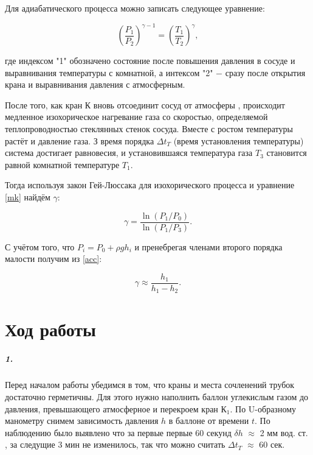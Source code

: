 \documentclass[a4paper,12pt]{article}
\begin{document}
Для адиабатического процесса можно записать следующее уравнение: 

\begin{equation}\label{mk}
\left(\dfrac{P_1}{P_2}\right)^{\gamma - 1} = \left(\dfrac{T_1}{T_2}\right)^\gamma , 
\end{equation} 

где индексом "1" обозначено состояние после повышения давления в сосуде и выравнивания температуры с комнатной, а интексом "2"  $-$ сразу после открытия крана и выравнивания давления с атмосферным. 

После того, как кран К вновь отсоединит сосуд от атмосферы , происходит медленное изохорическое нагревание газа со скоростью, определяемой теплопроводностью стеклянных стенок сосуда. Вместе с ростом температуры растёт и давление газа. З время порядка $\Delta t_T$  (время установления температуры) система достигает равновесия, и установившаяся температура газа $T_3$ становится равной комнатной температуре $T_1$. 

Тогда используя закон Гей-Люссака для изохорического процесса и уравнение \eqref{mk} найдём $\gamma$:

\begin{equation}\label{acc}
\gamma = \dfrac{\ln(P_1 / P_0)}{\ln (P_1 / P_3)}.
\end{equation}

С учётом того, что $P_i = P_0 + \rho g h_i$ и пренебрегая членами второго порядка малости получим из \eqref{acc}:

\begin{equation}\label{r}
\gamma \approx \dfrac{h_1}{h_1 - h_2}.
\end{equation}


\newpage

\section*{Ход работы}

\subparagraph*{1.} Перед началом работы убедимся в том, что краны и места сочленений трубок достаточно герметичны. Для этого нужно наполнить баллон углекислым газом до давления, превышающего атмосферное  и перекроем кран $К_1$. По  U-образному манометру снимем зависимость давления $h$ в баллоне от времени $t$. По наблюдению было выявлено что за первые первые 60 секунд $\delta h$ $\approx$ 2 мм вод. ст. , за следущие 3 мин не изменилось, так что можно считать $\Delta t_T$ $\approx$ 60 сек.
\end{document}
